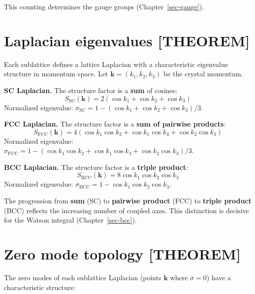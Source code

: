 \documentclass[
  11pt,
  letterpaper,
  twoside,
  openany]{book}
\makeatletter
\let\orig@section\section
\renewcommand{\section}{\needspace{8\baselineskip}\orig@section}
\makeatother
\begin{document}
This counting determines the gauge groups (Chapter~\ref{sec-gauge}).

\section{Laplacian eigenvalues
{[}THEOREM{]}}\label{laplacian-eigenvalues-theorem}

Each sublattice defines a lattice Laplacian with a characteristic
eigenvalue structure in momentum space. Let
\(\mathbf{k} = (k_1, k_2, k_3)\) be the crystal momentum.

\textbf{SC Laplacian.} The structure factor is a \textbf{sum} of
cosines: \[
S_{\text{SC}}(\mathbf{k}) = 2(\cos k_1 + \cos k_2 + \cos k_3)
\] Normalized eigenvalue:
\(\sigma_{\text{SC}} = 1 - (\cos k_1 + \cos k_2 + \cos k_3)/3\).

\textbf{FCC Laplacian.} The structure factor is a \textbf{sum of
pairwise products}: \[
S_{\text{FCC}}(\mathbf{k}) = 4(\cos k_1 \cos k_2 + \cos k_1 \cos k_3 + \cos k_2 \cos k_3)
\] Normalized eigenvalue:
\(\sigma_{\text{FCC}} = 1 - (\cos k_1 \cos k_2 + \cos k_1 \cos k_3 + \cos k_2 \cos k_3)/3\).

\textbf{BCC Laplacian.} The structure factor is a \textbf{triple
product}: \[
S_{\text{BCC}}(\mathbf{k}) = 8 \cos k_1 \cos k_2 \cos k_3
\] Normalized eigenvalue:
\(\sigma_{\text{BCC}} = 1 - \cos k_1 \cos k_2 \cos k_3\).

The progression from \textbf{sum} (SC) to \textbf{pairwise product}
(FCC) to \textbf{triple product} (BCC) reflects the increasing number of
coupled axes. This distinction is decisive for the Watson integral
(Chapter~\ref{sec-bcc}).

\section{Zero mode topology
{[}THEOREM{]}}\label{zero-mode-topology-theorem}

The zero modes of each sublattice Laplacian (points \(\mathbf{k}\) where
\(\sigma = 0\)) have a characteristic structure:
\end{document}
